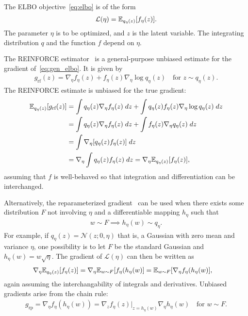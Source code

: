 The ELBO objective~\eqref{eq:elbo} is of the form
\begin{align}
    \mathcal{L}(\eta) = \mathbb{E}_{q_\eta(z)}[f_\eta(z)].
    \label{eq:gen_elbo}
\end{align}
The parameter $\eta$ is to be optimized, and $z$ is the latent variable. The integrating distribution $q$ and the function $f$ depend on $\eta$.

The REINFORCE estimator~\citep{Williams1992reinforce} is a general-purpose unbiased estimate for the gradient of~\eqref{eq:gen_elbo}.
It is given by
\begin{align}
    g_{\textrm{rf}}(z) = \nabla_\eta f_\eta(z) +
            f_\eta(z)  \nabla_\eta \log q_\eta(z)
    \quad \text{for }
    z\sim q_\eta(z).
\end{align}
The REINFORCE estimate is unbiased for the true gradient:
\begin{align}
    \mathbb{E}_{q_\eta(z)}[g_{\textrm{rf}}(z)] &=
    \int q_\eta(z) \nabla_\eta f_\eta(z) \; dz+
    \int q_\eta(z) f_\eta(z)  \nabla_\eta \log q_\eta(z)\; dz \\
    &= \int q_\eta(z) \nabla_\eta f_\eta(z) \; dz+
    \int f_\eta(z) \nabla_\eta q_\eta(z)  \; dz \\
    &= \int \nabla_\eta[q_\eta(z) f_\eta(z)] \; dz \\
    &= \nabla_\eta \int q_\eta(z) f_\eta(z) \; dz
    = \nabla_\eta \mathbb{E}_{q_\eta(z)}[f_\eta(z)],
\end{align}
assuming that $f$ is well-behaved so that integration and differentiation can be interchanged.

Alternatively, the reparameterized gradient~\citep{rezende2014stochastic, kingma2013autoencoding} can be used when there exists some distribution $F$ not involving $\eta$ and a differentiable mapping $h_\eta$ such that
\begin{align}
    w \sim F \implies h_\eta(w) \sim q_\eta.
\end{align}
For example, if $q_{\eta}(z) = \mathcal{N}(z; 0, \eta)$ that is, a Gaussian with zero mean and variance $\eta$, one possibility is to let $F$ be the standard Gaussian and $h_\eta(w) = w \sqrt{\eta}$.
The gradient of $\mathcal{L}(\eta)$ can then be written as
\begin{align}
    \nabla_\eta \mathbb{E}_{q_\eta(z)}[f_\eta(z)] &=
        \nabla_\eta \mathbb{E}_{w\sim F}[f_\eta(h_\eta(w)] = \mathbb{E}_{w\sim F}[\nabla_\eta f_\eta(h_\eta(w)],
\end{align}
again assuming the interchangability of integrals and derivatives.
Unbiased gradients arise from the chain rule: 
\begin{align}
    g_{\textrm{rp}}
    = \nabla_\eta f_\eta(h_\eta(w))
    = \nabla_z f_\eta(z)\Big|_{z = h_\eta(w)}
    \nabla_\eta h_\eta(w) \quad \text{for } w\sim F.
\end{align}

